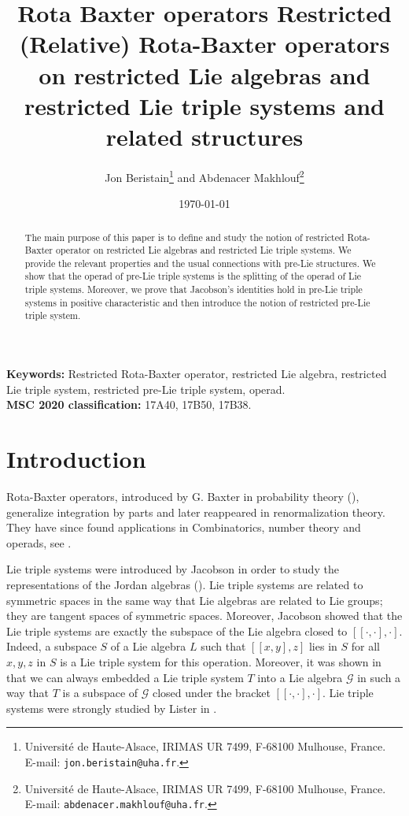 \documentclass[11pt, twoside]{article}
\title{Rota Baxter operators }
\author{Jon Beristain\footnote{Université de Haute-Alsace, IRIMAS UR 7499, F-68100 Mulhouse, France. \\ E-mail: \texttt{jon.beristain@uha.fr}. }  \; and  Abdenacer Makhlouf\footnote{Université de Haute-Alsace, IRIMAS UR 7499, F-68100 Mulhouse, France.\\ E-mail:  \texttt{abdenacer.makhlouf@uha.fr}.} }
\title{
Restricted (Relative) Rota-Baxter operators on restricted Lie algebras and restricted Lie triple systems and related structures}
\date{\today}
\begin{document}
	
	\newtheorem{thm}{Theorem}[section]
	\newtheorem{prop}[thm]{Proposition}
	\newtheorem{lem}[thm]{Lemma}
	\newtheorem{cor}[thm]{Corollary}
	\theoremstyle{definition}
	\newtheorem{defi}[thm]{Definition}
	\newtheorem*{rmq}{Remark}
	\newtheorem{ex}[thm]{Example}
	\maketitle
	
	\begin{abstract}
		The main purpose of this paper is to define and study  the notion of  restricted Rota-Baxter operator on  restricted Lie algebras and restricted Lie triple systems. We provide the relevant properties and the  usual connections with pre-Lie structures. We show that the operad of pre-Lie triple systems
is the splitting of the operad of Lie triple systems. Moreover, we prove that
Jacobson’s identities hold in pre-Lie triple systems in positive characteristic and then introduce
the notion of restricted pre-Lie triple system.
	\end{abstract}
	
	\noindent\textbf{Keywords:} Restricted Rota-Baxter operator, restricted Lie algebra, restricted Lie triple system, restricted pre-Lie triple system, operad. \\
	\noindent\textbf{MSC 2020 classification:} 		17A40, 17B50,	17B38.  
	\tableofcontents
	
\section{Introduction}
Rota-Baxter operators, introduced by G. Baxter in probability theory (\cite{B60}), generalize integration by parts and later reappeared in renormalization theory. They have since found applications in Combinatorics, number theory and operads, see \cite{Rota1995,Guo2000}.

Lie triple systems were introduced by Jacobson in order to study the representations of the Jordan algebras (\cite{J51}). Lie triple systems are related to symmetric spaces in the same way that Lie algebras are related to Lie groups; they are tangent spaces of symmetric spaces. Moreover, Jacobson showed that the Lie triple systems are exactly the subspace of the Lie algebra closed to $[[\cdot,\cdot],\cdot] $. Indeed, a subspace $S$ of a Lie algebra $L$ such that $[[x,y],z] $ lies in $S$ for all $x,y,z$ in $S$ is a Lie triple system for this operation. Moreover, it was shown in \cite{J51} that we can always embedded a Lie triple system $T$ into a Lie algebra $\mathcal{G} $ in such a way that $T$ is a subspace of $\mathcal{G} $ closed under the bracket $[[\cdot,\cdot],\cdot] $. Lie triple systems were strongly studied by Lister in \cite{L51}.
\end{document}
